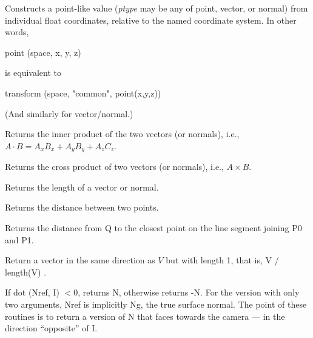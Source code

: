 \documentclass[11pt,letterpaper]{book}
\def\float{{\cf float}\xspace}
\def\normal{{\cf normal}\xspace}
\def\point{{\cf point}\xspace}
\def\vector{{\cf vector}\xspace}
\begin{document}
\apiend

  
Constructs a point-like value (\emph{ptype} may be any of \point,
\vector, or \normal) from individual \float coordinates, relative
to the named coordinate system.  In other words,
\begin{code}
    point (space, x, y, z)
\end{code}
\noindent is equivalent to
\begin{code}
    transform (space, "common", point(x,y,z))
\end{code}
(And similarly for \vector/\normal.)
\apiend

Returns the inner product of the two vectors (or normals), i.e., 
$A \cdot B = A_x B_x + A_y B_y + A_z C_z$.
\apiend

Returns the cross product of two vectors (or normals), i.e., 
$A \times B$.
\apiend

Returns the length of a vector or normal.
\apiend

Returns the distance between two points.
\apiend

Returns the distance from {\cf Q} to the closest point on the line
segment joining {\cf P0} and {\cf P1}.
\apiend

Return a vector in the same direction as $V$ but with length 1,
that is, {\cf V / length(V)} .
\apiend

If {\cf dot (Nref, I)} $<0$, returns {\cf N}, otherwise returns {\cf -N}.
For the version with only two arguments, {\cf Nref} is implicitly {\cf
Ng}, the true surface normal.  The point of these routines is to
return a version of {\cf N} that faces towards the camera --- in the
direction ``opposite'' of {\cf I}.
\end{document}
